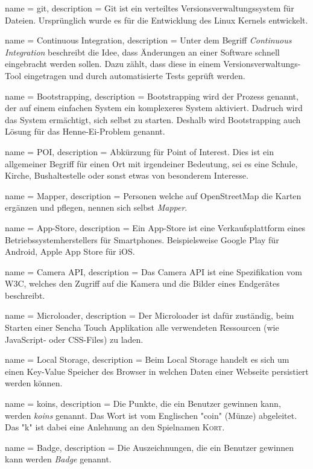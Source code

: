  {
	name = git,
	description = {Git ist ein verteiltes Versionsverwaltungssystem für Dateien. Ursprünglich wurde es für die Entwicklung des Linux Kernels entwickelt.}
}

 {
	name = Continuous Integration,
	description = {Unter dem Begriff \emph{Continuous Integration}\cite{cont-integration} beschreibt die Idee, dass Änderungen an einer Software schnell eingebracht werden sollen. Dazu zählt, dass diese in einem Versionsverwaltungs-Tool eingetragen und durch automatisierte Tests geprüft werden.}
}

 {
	name = Bootstrapping,
	description = {Bootstrapping wird der Prozess genannt, der auf einem einfachen System ein komplexeres System aktiviert\cite{bootstrapping}. Dadruch wird das System ermächtigt, sich selbst zu starten. Deshalb wird Bootstrapping auch Lösung für das Henne-Ei-Problem genannt.}
}

 {
	name = POI,
	description = {Abkürzung für Point of Interest. Dies ist ein allgemeiner Begriff für einen Ort mit irgendeiner Bedeutung, sei es eine Schule, Kirche, Bushaltestelle oder sonst etwas von besonderem Interesse.}
}

 {
	name = Mapper,
	description = {Personen welche auf OpenStreetMap die Karten ergänzen und pflegen, nennen sich selbst \emph{Mapper}.}
}

 {
	name = App-Store,
	description = {Ein App-Store ist eine Verkaufsplattform eines Betriebssystemherstellers für Smartphones. Beispielsweise Google Play für Android, Apple App Store für iOS.}
}

 {
	name = Camera API,
	description = {Das Camera API ist eine Spezifikation vom W3C\cite{camera-api}, welches den Zugriff auf die Kamera und die Bilder eines Endgerätes beschreibt.}
}

 {
	name = Microloader,
	description = {Der Microloader ist dafür zuständig, beim Starten einer Sencha Touch Applikation alle verwendeten Ressourcen (wie JavaScript- oder CSS-Files) zu laden.}
}

 {
	name = Local Storage,
	description = {Beim Local Storage handelt es sich um einen Key-Value Speicher des Browser in welchen Daten einer Webseite persistiert werden können.}
}

 {
	name = koins,
	description = {Die Punkte, die ein Benutzer gewinnen kann, werden \emph{koins} genannt.
	Das Wort ist vom Englischen "coin" (Münze) abgeleitet. 
	Das "k" ist dabei eine Anlehnung an den Spielnamen \textsc{Kort}.}
}

 {
	name = Badge,
	description = {Die Auszeichnungen, die ein Benutzer gewinnen kann werden \emph{Badge} genannt.}
}